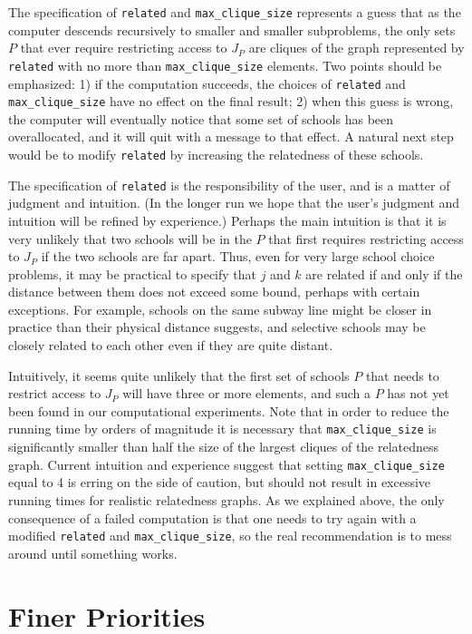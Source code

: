 \documentclass[12pt]{article}
\theoremstyle{definition}
\begin{document}
The specification of \texttt{related} and \texttt{max\_clique\_size}
represents a guess that as the computer descends recursively to
smaller and smaller subproblems, the only sets $P$ that ever require
restricting access to $J_P$ are cliques of the graph represented by
\texttt{related} with no more than \texttt{max\_clique\_size}
elements.  Two points should be emphasized: 1) if the computation
succeeds, the choices of \texttt{related} and
\texttt{max\_clique\_size} have no effect on the final result; 2) when
this guess is wrong, the computer will eventually notice that some set
of schools has been overallocated, and it will quit with a message to
that effect.  A natural next step would be to modify \texttt{related}
by increasing the relatedness of these schools.

The specification of \texttt{related} is the responsibility of the
user, and is a matter of judgment and intuition.  (In the longer run
we hope that the user's judgment and intuition will be refined by
experience.)  Perhaps the main intuition is that it is very unlikely
that two schools will be in the $P$ that first requires restricting
access to $J_P$ if the two schools are far apart.  Thus, even for very
large school choice problems, it may be practical to specify that $j$
and $k$ are related if and only if the distance between them does not
exceed some bound, perhaps with certain exceptions.  For example,
schools on the same subway line might be closer in practice than their
physical distance suggests, and selective schools may be closely
related to each other even if they are quite distant.

Intuitively, it seems quite unlikely that the first set of schools $P$
that needs to restrict access to $J_P$ will have three or more
elements, and such a $P$ has not yet been found in our computational
experiments.  Note that in order to reduce the running time by orders
of magnitude it is necessary that \texttt{max\_clique\_size} is
significantly smaller than half the size of the largest cliques of the
relatedness graph.  Current intuition and experience suggest that
setting \texttt{max\_clique\_size} equal to 4 is erring on the side of
caution, but should not result in excessive running times for
realistic relatedness graphs.  As we explained above, the only
consequence of a failed computation is that one needs to try again
with a modified \texttt{related} and \texttt{max\_clique\_size}, so
the real recommendation is to mess around until something works.

\section{Finer Priorities}
\end{document}
